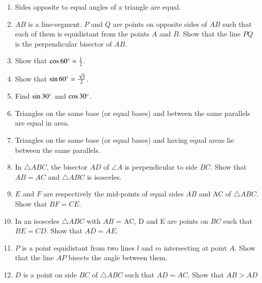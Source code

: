 \begin{enumerate}[label=\thesection.\arabic*.,ref=\thesection.\theenumi]
\item  Sides opposite to equal angles of a triangle are equal. 
%
\item $AB$ is a line-segment. $P$ and $Q$ are points on opposite sides of $AB$ such that each of them is equidistant from the points $A$ and $B$. Show that the line $PQ $ is the perpendicular bisector of $AB$.
%
\item Show that $\cos 60\degree = \frac{1}{2} $.  
\item Show that $\sin 60\degree = \frac{\sqrt{3}}{2} $.
\item Find  $\sin 30\degree$ and  $\cos 30\degree$.
\item Triangles on the same base (or equal bases) and between the same parallels are equal in area.
\\
\solution

\item Triangles on the same base (or equal bases) and having equal areas lie between the same parallels.
\item In $\triangle ABC$, the bisector $AD$ of $\angle  A$ is perpendicular to side $BC$. Show that $AB = AC$ and $\triangle ABC$ is isosceles.
\item $E$ and $F$ are respectively the mid-points of equal sides $AB$ and AC of $\triangle ABC$. Show that $BF = CE$. 
\item In an isosceles $\triangle ABC$ with $AB$ = AC, D and E are points on $BC$ such that $BE = CD$. Show that $AD = AE$. 
%
%
\item $P$ is a point equidistant from two lines $l$ and $m$ intersecting at point $A$.  Show that the line  $AP$  bisects the angle between them.
%
\item $D$ is a point on side $BC$ of $\triangle  ABC$ such that $AD = AC$. Show that $AB > AD$


\end{enumerate}
